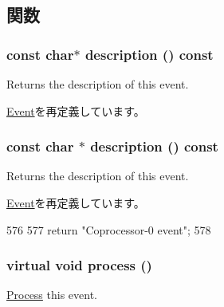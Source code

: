 \subsection{関数}
\hypertarget{classMipsISA_1_1ISA_1_1CP0Event_a2bd90422eece9190794479e08092a252}{
\subsubsection[{description}]{\setlength{\rightskip}{0pt plus 5cm}const char$\ast$ description () const}}
\label{classMipsISA_1_1ISA_1_1CP0Event_a2bd90422eece9190794479e08092a252}
Returns the description of this event. 

\hyperlink{classEvent_a130ddddf003422b413e2e891b1b80e8f}{Event}を再定義しています。\hypertarget{classMipsISA_1_1ISA_1_1CP0Event_a5a14fe478e2393ff51f02e9b7be27e00}{
\subsubsection[{description}]{\setlength{\rightskip}{0pt plus 5cm}const char $\ast$ description () const}}
\label{classMipsISA_1_1ISA_1_1CP0Event_a5a14fe478e2393ff51f02e9b7be27e00}
Returns the description of this event. 

\hyperlink{classEvent_a130ddddf003422b413e2e891b1b80e8f}{Event}を再定義しています。


\begin{DoxyCode}
576 {
577     return "Coprocessor-0 event";
578 }
\end{DoxyCode}
\hypertarget{classMipsISA_1_1ISA_1_1CP0Event_a6780fc1879338e1ff38faf7279ec6a0b}{
\subsubsection[{process}]{\setlength{\rightskip}{0pt plus 5cm}virtual void process ()}}
\label{classMipsISA_1_1ISA_1_1CP0Event_a6780fc1879338e1ff38faf7279ec6a0b}
\hyperlink{classProcess}{Process} this event. 

